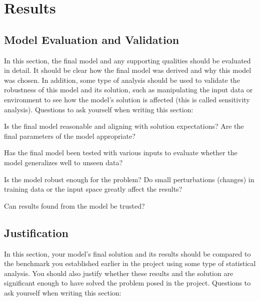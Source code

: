 \documentclass[12pt,journal,compsoc]{IEEEtran}
\begin{document}





\section{Results} %
\subsection{Model Evaluation and Validation}\label{sec:eval}
In this section, the final model and any supporting qualities should be evaluated in detail. It should be clear how the final model was derived and why this model was chosen. In addition, some type of analysis should be used to validate the robustness of this model and its solution, such as manipulating the input data or environment to see how the model’s solution is affected (this is called sensitivity analysis). Questions to ask yourself when writing this section:

Is the final model reasonable and aligning with solution expectations? Are the final parameters of the model appropriate?

Has the final model been tested with various inputs to evaluate whether the model generalizes well to unseen data?

Is the model robust enough for the problem? Do small perturbations (changes) in training data or the input space greatly affect the results?

Can results found from the model be trusted?


\subsection{Justification}
In this section, your model’s final solution and its results should be compared to the benchmark you established earlier in the project using some type of statistical analysis. You should also justify whether these results and the solution are significant enough to have solved the problem posed in the project. Questions to ask yourself when writing this section:
\end{document}
